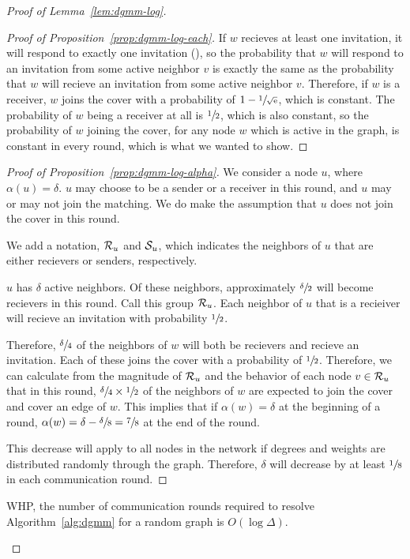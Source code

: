 \begin{proof}[Proof of Lemma~\ref{lem:dgmm-log}]
\begin{proof}[Proof of Proposition~\ref{prop:dgmm-log-each}]
If $w$ recieves at least one invitation, it will respond to exactly one invitation (), so the probability that $w$ will respond to an invitation from some active neighbor $v$ is exactly the same as the probability that $w$ will recieve an invitation from some active neighbor $v$. Therefore, if $w$ is a receiver, $w$ joins the cover with a probability of $1 - \sfrac{1}{\sqrt{{\mathrm{e}}}}$, which is constant. The probability of $w$ being a receiver at all is $\sfrac{1}{2}$, which is also constant, so the probability of $w$ joining the cover, for any node $w$ which is active in the graph, is constant in every round, which is what we wanted to show. 
\end{proof}

\begin{proof}[Proof of Proposition~\ref{prop:dgmm-log-alpha}]

We consider a node $u$, where $\alpha(u) = \delta$. $u$ may choose to be a sender or a receiver in this round, and $u$ may or may not join the matching. We do make the assumption that $u$ does not join the cover in this round.

We add a notation, ${\mathcal R}_u$ and ${\mathcal S}_u$, which indicates the neighbors of $u$ that are either recievers or senders, respectively.

$u$ has $\delta$ active neighbors. Of these neighbors, approximately $\sfrac{\delta}{2}$ will become recievers in this round. Call this group ${\mathcal R}_u$. Each neighbor of $u$ that is a recieiver will recieve an invitation with probability $\sfrac{1}{2}$.

Therefore, $\sfrac{\delta}{4}$ of the neighbors of $w$ will both be recievers and recieve an invitation. Each of these joins the cover with a probability of $\sfrac{1}{2}$. Therefore, we can calculate from the magnitude of ${\mathcal R}_u$ and the behavior of each node $v \in {\mathcal R}_u$ that in this round, $\sfrac{\delta}{4}\times \sfrac{1}{2}$ of the neighbors of $w$ are expected to join the cover and cover an edge of $w$. This implies that if $\alpha(w) = \delta$ at the beginning of a round, $\alpha(w) = \delta-\sfrac{\delta}{8} = \sfrac{7}{8}$ at the end of the round.

This decrease will apply to all nodes in the network if degrees and weights are distributed randomly through the graph. Therefore, $\delta$ will decrease by at least $\sfrac{1}{8}$ in each communication round. 
\end{proof}

\begin{cor}WHP, the number of communication rounds required to resolve Algorithm~\ref{alg:dgmm} for a random graph is $O(\log\Delta)$.\end{cor}

\end{proof} 

